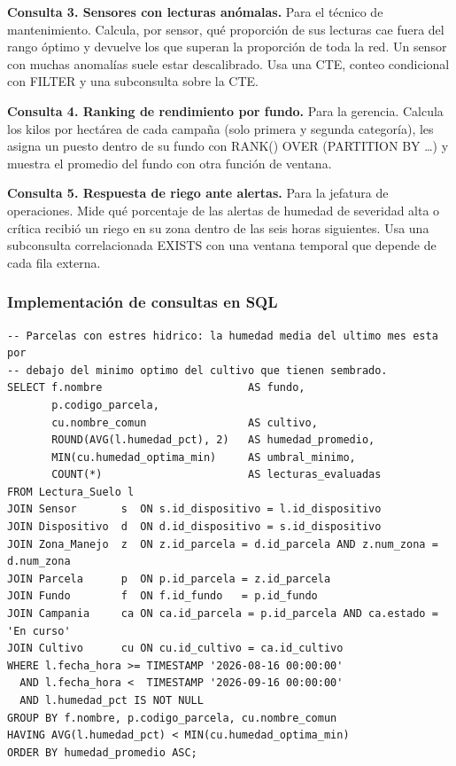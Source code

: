 \documentclass[11pt,letterpaper]{article}
\newcommand{\tbus}{\textunderscore\allowbreak}
\newcommand{\tb}[1]{{\ttfamily\let\_\tbus #1}}
\begin{document}
\textbf{Consulta 3. Sensores con lecturas anómalas.} Para el técnico de mantenimiento. Calcula, por sensor, qué proporción de sus lecturas cae fuera del rango óptimo y devuelve los que superan la proporción de toda la red. Un sensor con muchas anomalías suele estar descalibrado. Usa una CTE, conteo condicional con \tb{FILTER} y una subconsulta sobre la CTE.

\textbf{Consulta 4. Ranking de rendimiento por fundo.} Para la gerencia. Calcula los kilos por hectárea de cada campaña (solo primera y segunda categoría), les asigna un puesto dentro de su fundo con \tb{RANK() OVER (PARTITION BY \ldots)} y muestra el promedio del fundo con otra función de ventana.

\textbf{Consulta 5. Respuesta de riego ante alertas.} Para la jefatura de operaciones. Mide qué porcentaje de las alertas de humedad de severidad alta o crítica recibió un riego en su zona dentro de las seis horas siguientes. Usa una subconsulta correlacionada \tb{EXISTS} con una ventana temporal que depende de cada fila externa.

\subsubsection{Implementación de consultas en SQL}

\begin{lstlisting}[style=sql, title={Consulta 1}]
-- Parcelas con estres hidrico: la humedad media del ultimo mes esta por
-- debajo del minimo optimo del cultivo que tienen sembrado.
SELECT f.nombre                       AS fundo,
       p.codigo_parcela,
       cu.nombre_comun                AS cultivo,
       ROUND(AVG(l.humedad_pct), 2)   AS humedad_promedio,
       MIN(cu.humedad_optima_min)     AS umbral_minimo,
       COUNT(*)                       AS lecturas_evaluadas
FROM Lectura_Suelo l
JOIN Sensor       s  ON s.id_dispositivo = l.id_dispositivo
JOIN Dispositivo  d  ON d.id_dispositivo = s.id_dispositivo
JOIN Zona_Manejo  z  ON z.id_parcela = d.id_parcela AND z.num_zona = d.num_zona
JOIN Parcela      p  ON p.id_parcela = z.id_parcela
JOIN Fundo        f  ON f.id_fundo   = p.id_fundo
JOIN Campania     ca ON ca.id_parcela = p.id_parcela AND ca.estado = 'En curso'
JOIN Cultivo      cu ON cu.id_cultivo = ca.id_cultivo
WHERE l.fecha_hora >= TIMESTAMP '2026-08-16 00:00:00'
  AND l.fecha_hora <  TIMESTAMP '2026-09-16 00:00:00'
  AND l.humedad_pct IS NOT NULL
GROUP BY f.nombre, p.codigo_parcela, cu.nombre_comun
HAVING AVG(l.humedad_pct) < MIN(cu.humedad_optima_min)
ORDER BY humedad_promedio ASC;
\end{lstlisting}
\end{document}
